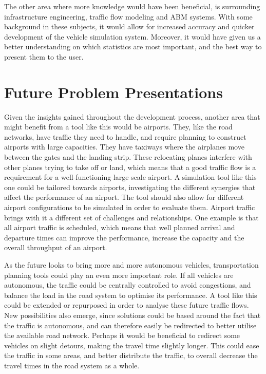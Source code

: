         The other area where more knowledge would have been beneficial, is surrounding infrastructure engineering, traffic flow modeling and ABM systems. With some background in these subjects, it would allow for increased accuracy and quicker development of the vehicle simulation system. Moreover, it would have given us a better understanding on which statistics are most important, and the best way to present them to the user.

    \section{Future Problem Presentations}
        Given the insights gained throughout the development process, another area that might benefit from a tool like this would be airports. They, like the road networks, have traffic they need to handle, and require planning to construct airports with large capacities. They have taxiways where the airplanes move between the gates and the landing strip. These relocating planes interfere with other planes trying to take off or land, which means that a good traffic flow is a requirement for a well-functioning large scale airport. A simulation tool like this one could be tailored towards airports, investigating the different synergies that affect the performance of an airport. The tool should also allow for different airport configurations to be simulated in order to evaluate them. Airport traffic brings with it a different set of challenges and relationships. One example is that all airport traffic is scheduled, which means that well planned arrival and departure times can improve the performance, increase the capacity and the overall throughput of an airport.

        As the future looks to bring more and more autonomous vehicles, transportation planning tools could play an even more important role. If all vehicles are autonomous, the traffic could be centrally controlled to avoid congestions, and balance the load in the road system to optimise its performance. A tool like this could be extended or repurposed in order to analyse these future traffic flows. New possibilities also emerge, since solutions could be based around the fact that the traffic is autonomous, and can therefore easily be redirected to better utilise the available road network. Perhaps it would be beneficial to redirect some vehicles on slight detours, making the travel time slightly longer. This could ease the traffic in some areas, and better distribute the traffic, to overall decrease the travel times in the road system as a whole.



